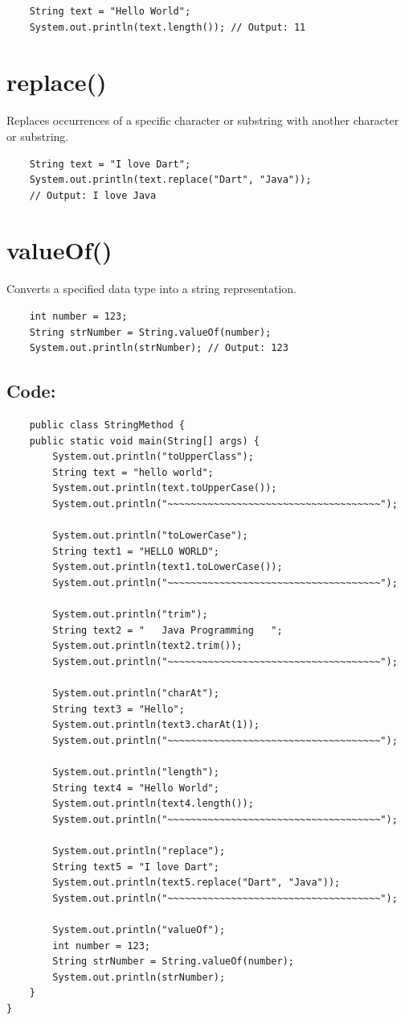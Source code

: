 \documentclass[a4paper,12pt]{article}
\begin{document}
\begin{lstlisting}
    String text = "Hello World";
    System.out.println(text.length()); // Output: 11      
\end{lstlisting}

\section{replace()}
Replaces occurrences of a specific character or substring with another character or substring.
\begin{lstlisting}
    String text = "I love Dart";
    System.out.println(text.replace("Dart", "Java")); 
    // Output: I love Java      
\end{lstlisting}

\section{valueOf()}
Converts a specified data type into a string representation.
\begin{lstlisting}
    int number = 123;
    String strNumber = String.valueOf(number);
    System.out.println(strNumber); // Output: 123       
\end{lstlisting}

\subsection{Code:}
\begin{lstlisting}
    public class StringMethod {
    public static void main(String[] args) {
        System.out.println("toUpperClass");
        String text = "hello world";
        System.out.println(text.toUpperCase());
        System.out.println("~~~~~~~~~~~~~~~~~~~~~~~~~~~~~~~~~~~~~");

        System.out.println("toLowerCase");
        String text1 = "HELLO WORLD";
        System.out.println(text1.toLowerCase());
        System.out.println("~~~~~~~~~~~~~~~~~~~~~~~~~~~~~~~~~~~~~");

        System.out.println("trim");
        String text2 = "   Java Programming   ";
        System.out.println(text2.trim());
        System.out.println("~~~~~~~~~~~~~~~~~~~~~~~~~~~~~~~~~~~~~");

        System.out.println("charAt");
        String text3 = "Hello";
        System.out.println(text3.charAt(1));
        System.out.println("~~~~~~~~~~~~~~~~~~~~~~~~~~~~~~~~~~~~~");

        System.out.println("length");
        String text4 = "Hello World";
        System.out.println(text4.length());  
        System.out.println("~~~~~~~~~~~~~~~~~~~~~~~~~~~~~~~~~~~~~");

        System.out.println("replace");
        String text5 = "I love Dart";
        System.out.println(text5.replace("Dart", "Java"));
        System.out.println("~~~~~~~~~~~~~~~~~~~~~~~~~~~~~~~~~~~~~");

        System.out.println("valueOf");
        int number = 123;
        String strNumber = String.valueOf(number);
        System.out.println(strNumber);
    }
}
\end{lstlisting}
\end{document}
